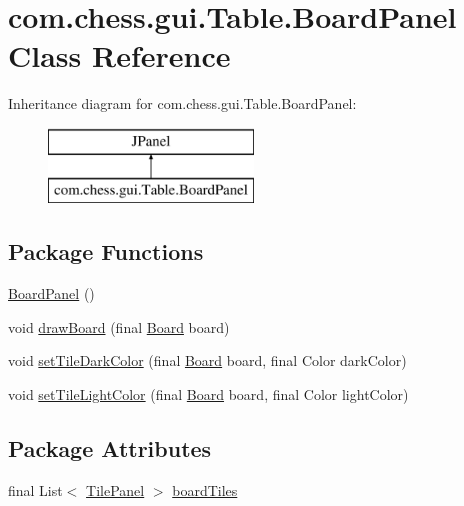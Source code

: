 \hypertarget{classcom_1_1chess_1_1gui_1_1_table_1_1_board_panel}{}\section{com.\+chess.\+gui.\+Table.\+Board\+Panel Class Reference}
\label{classcom_1_1chess_1_1gui_1_1_table_1_1_board_panel}
Inheritance diagram for com.\+chess.\+gui.\+Table.\+Board\+Panel\+:\begin{figure}[H]
\begin{center}
\leavevmode
\includegraphics[height=2.000000cm]{classcom_1_1chess_1_1gui_1_1_table_1_1_board_panel}
\end{center}
\end{figure}
\subsection*{Package Functions}
\begin{DoxyCompactItemize}
\item 
\mbox{\hyperlink{classcom_1_1chess_1_1gui_1_1_table_1_1_board_panel_a4e1b0d00700e023a46f0452138a219c7}{Board\+Panel}} ()
\item 
void \mbox{\hyperlink{classcom_1_1chess_1_1gui_1_1_table_1_1_board_panel_af15bf7c921d0fc5d8942cd2d19ff887c}{draw\+Board}} (final \mbox{\hyperlink{classcom_1_1chess_1_1engine_1_1classic_1_1board_1_1_board}{Board}} board)
\item 
void \mbox{\hyperlink{classcom_1_1chess_1_1gui_1_1_table_1_1_board_panel_a4bb829f7c319e8525762ba9294ce4863}{set\+Tile\+Dark\+Color}} (final \mbox{\hyperlink{classcom_1_1chess_1_1engine_1_1classic_1_1board_1_1_board}{Board}} board, final Color dark\+Color)
\item 
void \mbox{\hyperlink{classcom_1_1chess_1_1gui_1_1_table_1_1_board_panel_ac8895ee9f4e58562ae027fbd9e93f787}{set\+Tile\+Light\+Color}} (final \mbox{\hyperlink{classcom_1_1chess_1_1engine_1_1classic_1_1board_1_1_board}{Board}} board, final Color light\+Color)
\end{DoxyCompactItemize}
\subsection*{Package Attributes}
\begin{DoxyCompactItemize}
\item 
final List$<$ \mbox{\hyperlink{classcom_1_1chess_1_1gui_1_1_table_1_1_tile_panel}{Tile\+Panel}} $>$ \mbox{\hyperlink{classcom_1_1chess_1_1gui_1_1_table_1_1_board_panel_aea3607737d3225a022a84e7006cb4530}{board\+Tiles}}
\end{DoxyCompactItemize}


